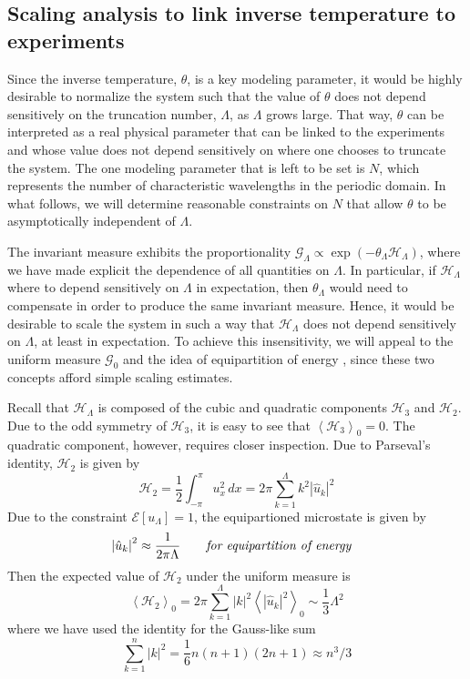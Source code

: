 \documentclass[11pt]{article}
\newcommand{\abs}[1]{\left| #1 \right|}
\newcommand{\mean}[1]{\left< #1 \right>}
\newcommand{\dx}{\, dx}
\newcommand{\lamfac}{N}
\newcommand{\En}{\mathcal{E}}
\newcommand{\uhat}{\hat{u}}
\newcommand{\Ham}{\mathcal{H}}
\newcommand{\Hthree}{\Ham_{3}}
\newcommand{\Htwo}{\Ham_{2}}
\newcommand{\uL}{u_{\Lambda}}
\newcommand{\Gibbs}{\mathcal{G}}
\newcommand{\Gz}{\Gibbs_0}
\newcommand{\meanz}[1]{\mean{#1}_0}
\begin{document}
\subsection{Scaling analysis to link inverse temperature to experiments}

	Since the inverse temperature, $\theta$, is a key modeling parameter, it would be highly desirable to normalize the system such that the value of $\theta$ does not depend sensitively on the truncation number, $\Lambda$, as $\Lambda$ grows large. That way, $\theta$ can be interpreted as a real physical parameter that can be linked to the experiments and whose value does not depend sensitively on where one chooses to truncate the system. The one modeling parameter that is left to be set is $\lamfac$, which represents the number of characteristic wavelengths in the periodic domain. In what follows, we will determine reasonable constraints on $\lamfac$ that allow $\theta$ to be asymptotically independent of $\Lambda$.
	
	The invariant measure exhibits the proportionality $ \Gibbs_{\Lambda} \propto \exp(-\theta_{\Lambda} \Ham_{\Lambda})$, where we have made explicit the dependence of all quantities on $\Lambda$. In particular, if $\Ham_{\Lambda}$ where to depend sensitively on $\Lambda$ in expectation, then $\theta_{\Lambda}$ would need to compensate in order to produce the same invariant measure. Hence, it would be desirable to scale the system in such a way that $\Ham_{\Lambda}$ does not depend sensitively on $\Lambda$, at least in expectation. 
To achieve this insensitivity, we will appeal to the uniform measure $\Gz$ and the idea of equipartition of energy \cite{abramov2003}, since these two concepts afford simple scaling estimates.

Recall that $\Ham_{\Lambda}$ is composed of the cubic and quadratic components $\Hthree$ and $\Htwo$. Due to the odd symmetry of $\Hthree$, it is easy to see that $\meanz{\Hthree} = 0$. The quadratic component, however, requires closer inspection. Due to Parseval's identity, $\Htwo$ is given by
\begin{equation}
\Htwo = \frac{1}{2} \int_{-\pi}^{\pi} u_x^2 \dx = 2 \pi \sum_{k=1}^{\Lambda} k^2 \abs{\uhat_k}^2
\end{equation}
Due to the constraint $\En[\uL] = 1$, the equipartioned microstate is given by 
\begin{align}
&\abs{\uhat_k}^2 \approx \frac{1}{2 \pi \Lambda}	 \qquad \mbox{\em for equipartition of energy}
\end{align}
Then the expected value of $\Htwo$ under the uniform measure is
\begin{equation}
\label{HtwoExpect}
\mean{\Htwo}_0 = 2 \pi \sum_{k=1}^{\Lambda} \abs{k}^ 2 \mean{\abs{\uhat_k}^2}_0 \sim \frac{1}{3} \Lambda^2
\end{equation}
where we have used the identity for the Gauss-like sum
\begin{equation}
\sum_{k=1}^{n} \abs{k}^ 2 = \frac{1}{6} n(n+1)(2n+1) \approx n^3/3
\end{equation}
\end{document}
